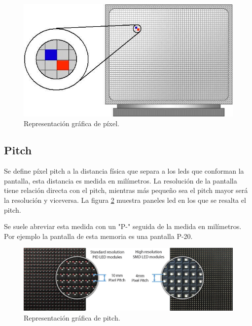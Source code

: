 \begin{figure}[htpb]
	\centering
	\includegraphics[scale=0.3]{Figures/pixel-definicion.jpg} 
	\caption{Representación gráfica de píxel\protect\footnotemark.}
	\label{fig:pixelimagen}
\end{figure}

\subsection{Pitch}
Se define píxel pitch a la distancia física que separa a los leds que conforman la pantalla, esta distancia es medida en milímetros. La resolución de la pantalla tiene relación directa con el pitch, mientras más pequeño sea el pitch mayor será la resolución y viceversa\citep{IMAGENDEF2}. La figura \ref{fig:pixelpitch} muestra paneles led en los que se resalta el pitch.

Se suele abreviar esta medida con un "P-" seguida de la medida en milímetros. Por ejemplo la pantalla de esta memoria es una pantalla P-20.

\begin{figure}[htpb]
	\centering
	\includegraphics[scale=0.3]{Figures/pitch.jpg} 
	\caption{Representación gráfica de pitch\protect\footnotemark.}
	\label{fig:pixelpitch}
\end{figure}



